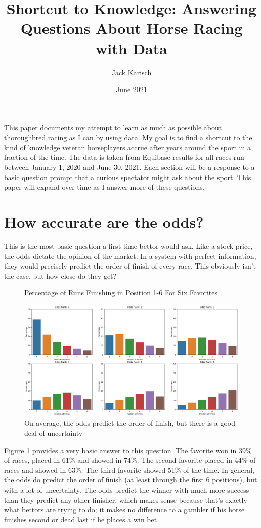 \documentclass{article}
\title{Shortcut to Knowledge: Answering Questions About Horse Racing with Data}
\author{Jack Karisch}
\date{June 2021}
\begin{document}
\maketitle

This paper documents my attempt to learn as much as possible about thoroughbred racing as I can by using data. My goal is to find a shortcut to the kind of knowledge veteran horseplayers accrue after years around the sport in a fraction of the time. The data is taken from Equibase results for all races run between January 1, 2020 and June 30, 2021. Each section will be a response to a basic question prompt that a curious spectator might ask about the sport. This paper will expand over time as I answer more of these questions.

\section*{How accurate are the odds?}

This is the most basic question a first-time bettor would ask. Like a stock price, the odds dictate the opinion of the market. In a system with perfect information, they would precisely predict the order of finish of every race. This obviously isn't the case, but how close do they get?

\begin{figure}
    \centering
    \textrm{Percentage of Runs Finishing in Position 1-6 For Six Favorites}\par \medskip
    \includegraphics[width=12cm]{images/odds_rank_finish_chart.png}\medskip

    \caption{On average, the odds predict the order of finish, but there is a good deal of uncertainty}
    \label{figure:oddsRanksFinish}

\end{figure}

Figure \ref{figure:oddsRanksFinish} provides a very basic answer to this question. The favorite won in 39\% of races, placed in 61\% and showed in 74\%. The second favorite placed in 44\% of races and showed in 63\%. The third favorite showed 51\% of the time. In general, the odds do predict the order of finish (at least through the first 6 positions), but with a lot of uncertainty. The odds predict the winner with much more success than they predict any other finisher, which makes sense because that's exactly what bettors are trying to do; it makes no difference to a gambler if his horse finishes second or dead last if he places a win bet.
\end{document}
